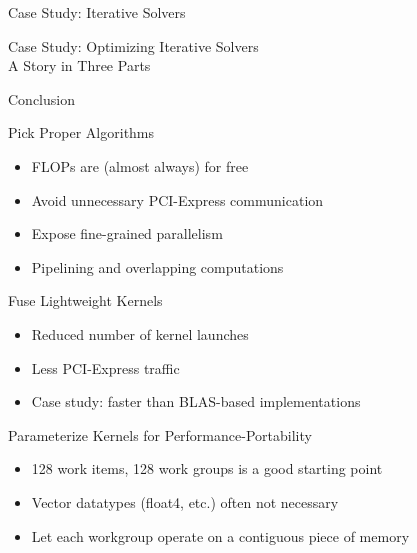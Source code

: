 \begin{frame}{Case Study: Iterative Solvers}

  \begin{center}
   {\Large Case Study: Optimizing Iterative Solvers} \\[1.5em]
   {A Story in Three Parts}
  \end{center}

\end{frame}





%
%



%
%








\begin{frame}{Conclusion}

  \begin{block}{Pick Proper Algorithms}
    \begin{itemize}
      \item FLOPs are (almost always) for free
      \item Avoid unnecessary PCI-Express communication
      \item Expose fine-grained parallelism
      \item Pipelining and overlapping computations
    \end{itemize}
  \end{block}

  \vspace*{-0.3cm}
  \begin{block}{Fuse Lightweight Kernels}
    \begin{itemize}
     \item Reduced number of kernel launches
     \item Less PCI-Express traffic
     \item Case study: faster than BLAS-based implementations
    \end{itemize}
  \end{block}

  \vspace*{-0.3cm}
  \begin{block}{Parameterize Kernels for Performance-Portability}
    \begin{itemize}
     \item 128 work items, 128 work groups is a good starting point
     \item Vector datatypes (float4, etc.) often not necessary
     \item Let each workgroup operate on a contiguous piece of memory
    \end{itemize}
  \end{block}

\end{frame}



